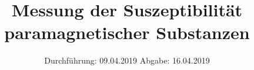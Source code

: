 

\subject{Nr. 606}
\title{Messung der Suszeptibilität paramagnetischer Substanzen}
\date{%
  Durchführung: 09.04.2019
  \hspace{3em}
  Abgabe: 16.04.2019
}



\maketitle
\thispagestyle{empty}
\tableofcontents
\newpage






\printbibliography{}


